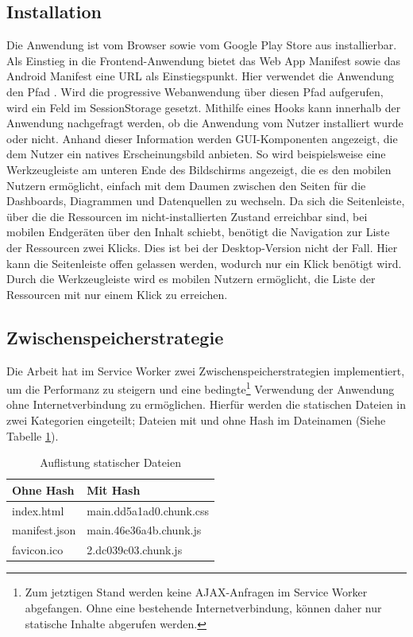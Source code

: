 \subsection{Installation}
\label{subec:installation}
Die Anwendung ist vom Browser sowie vom Google Play Store aus installierbar. Als Einstieg
in die Frontend-Anwendung bietet das Web App Manifest sowie das Android Manifest eine URL als Einstiegspunkt.
Hier verwendet die Anwendung den Pfad . Wird die progressive Webanwendung über diesen Pfad
aufgerufen, wird ein Feld im SessionStorage gesetzt. Mithilfe eines  Hooks kann innerhalb
der Anwendung nachgefragt werden, ob die Anwendung vom Nutzer installiert wurde oder nicht. Anhand dieser
Information werden GUI-Komponenten angezeigt, die dem Nutzer ein natives Erscheinungsbild anbieten. So wird beispielsweise
eine Werkzeugleiste am unteren Ende des Bildschirms angezeigt, die es den mobilen Nutzern ermöglicht,
einfach mit dem Daumen zwischen den Seiten für die Dashboards, Diagrammen und Datenquellen zu wechseln.
Da sich die Seitenleiste, über die die Ressourcen im nicht-installierten Zustand erreichbar sind, bei mobilen
Endgeräten über den Inhalt schiebt, benötigt die Navigation zur Liste der Ressourcen zwei Klicks. Dies ist
bei der Desktop-Version nicht der Fall. Hier kann die Seitenleiste offen gelassen werden, wodurch nur ein Klick
benötigt wird. Durch die Werkzeugleiste wird es mobilen Nutzern ermöglicht, die Liste der Ressourcen mit nur einem
Klick zu erreichen.


\subsection{Zwischenspeicherstrategie}
\label{subsec:zwischenspeicherstrategie}
Die Arbeit hat im Service Worker zwei Zwischenspeicherstrategien implementiert,
um die Performanz zu steigern und eine bedingte\footnote{Zum jetztigen Stand
werden keine AJAX-Anfragen im Service Worker abgefangen. Ohne eine bestehende Internetverbindung,
können daher nur statische Inhalte abgerufen werden.}
Verwendung der Anwendung ohne Internetverbindung zu ermöglichen. Hierfür werden die statischen Dateien in zwei
Kategorien eingeteilt; Dateien mit und ohne Hash im Dateinamen (Siehe Tabelle \ref{tab:auflistungstatischerdateien}).

\begin{table}[h]
\begin{center}
\begin{tabular}{ll}
Ohne Hash & Mit Hash\\
\hline
index.html & main.dd5a1ad0.chunk.css\\
manifest.json & main.46e36a4b.chunk.js\\
favicon.ico & 2.dc039c03.chunk.js\\
\end{tabular}
\end{center}
\caption{Auflistung statischer Dateien}
\label{tab:auflistungstatischerdateien}
\end{table}

